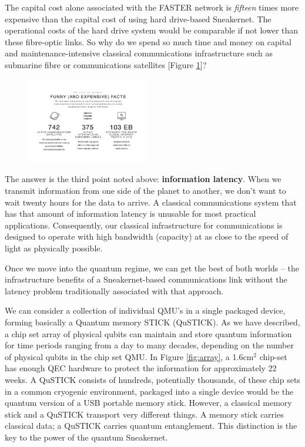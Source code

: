 \documentclass[twocolumn, aps, rmp, amsmath, amssymb, nofootinbib, superscriptaddress, longbibliography, floatfix, table-of-contents, eqsecnum]{revtex4-2}
\begin{document}
The capital cost alone associated with the FASTER network is \textit{fifteen} times more expensive than the capital cost of using hard drive-based Sneakernet. The operational costs of the hard drive system would be comparable if not lower than these fibre-optic links. So why do we spend so much time and money on capital and maintenance-intensive classical communications infrastructure such as submarine fibre or communications satellites [Figure \ref{fig:classical}]?

\begin{figure}[htbp!]
	\includegraphics[clip=true, width=0.475\textwidth]{classical}
	\caption{}
	\label{fig:classical}
\end{figure}

The answer is the third point noted above: \textbf{information latency}. When we transmit information from one side of the planet to another, we don't want to wait twenty hours for the data to arrive. A classical communications system that has that amount of information latency is unusable for most practical applications. Consequently, our classical infrastructure for communications is designed to operate with high bandwidth (capacity) at as close to the speed of light as physically possible. 

Once we move into the quantum regime, we can get the best of both worlds -- the infrastructure benefits of a Sneakernet-based communications link without the latency problem traditionally associated with that approach. 

We can consider a collection of individual QMU's in a single packaged device, forming basically a Quantum memory STICK (QuSTICK). As we have described, a chip set array of physical qubits can maintain and store quantum information for time periods ranging from a day to many decades, depending on the number of physical qubits in the chip set QMU. In Figure \ref{fig:array}, a 1.6cm$^2$ chip-set has enough QEC hardware to protect the information for approximately 22 weeks. A QuSTICK consists of hundreds, potentially thousands, of these chip sets in a common cryogenic environment, packaged into a single device would be the quantum version of a USB portable memory stick. However, a classical memory stick and a QuSTICK transport very different things. A memory stick carries classical data; a QuSTICK carries quantum entanglement. This distinction is the key to the power of the quantum Sneakernet. 
\end{document}

